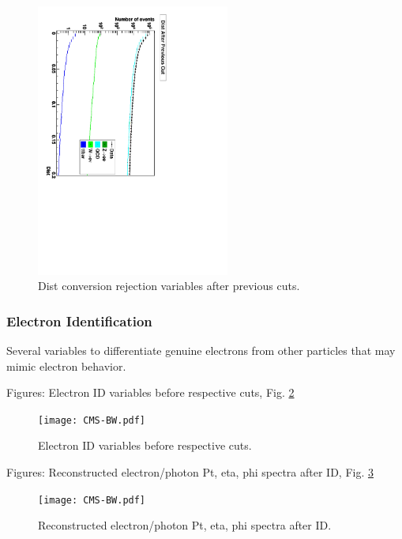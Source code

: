  \begin{figure}[htb]
  \begin{center}
    \includegraphics[width=180pt, angle=90]{distSeq.pdf}
  \end{center}
  \caption[Dist conversion rejection variables after previous cuts]{Dist conversion rejection variables after previous cuts.}
  \label{fig:DistConvRejVars}
 \end{figure}


\subsubsection{Electron Identification}
Several variables to differentiate genuine electrons from other particles that may mimic electron behavior.  

Figures: Electron ID variables before respective cuts, Fig. \ref{fig:ElecIdVars}

 \begin{figure}[htb]
  \begin{center}
    \texttt{[image: CMS-BW.pdf]}
  \end{center}
  \caption[Electron ID variables before respective cuts]{Electron ID variables before respective cuts.}
  \label{fig:ElecIdVars}
 \end{figure}



Figures: Reconstructed electron/photon Pt, eta, phi spectra after ID, Fig. \ref{fig:RecoSpectraAfterEid}

 \begin{figure}[htb]
  \begin{center}
    \texttt{[image: CMS-BW.pdf]}
  \end{center}
  \caption[Reconstructed electron/photon Pt, eta, phi spectra after ID]{Reconstructed electron/photon Pt, eta, phi spectra after ID.}
  \label{fig:RecoSpectraAfterEid}
 \end{figure}


